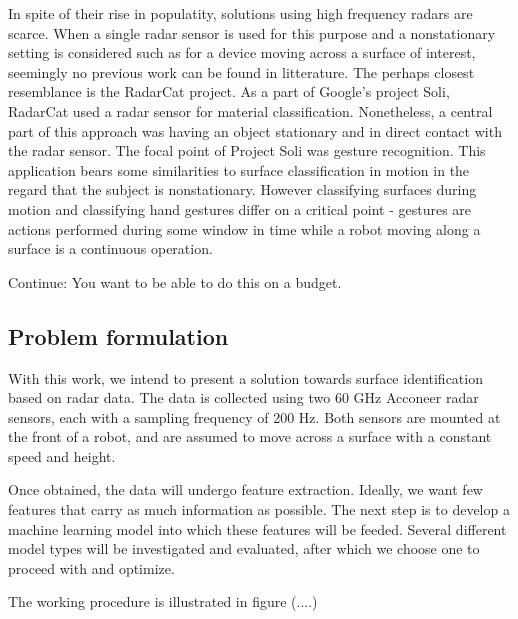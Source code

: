 In spite of their rise in populatity, solutions using high frequency radars are scarce. When a single radar sensor is used for this purpose and a nonstationary setting is considered such as for a device moving across a surface of interest, seemingly no previous work can be found in litterature. The perhaps closest resemblance is the RadarCat project\citep{yeo_2016}. As a part of Google's project Soli, RadarCat used a radar sensor for material classification. Nonetheless, a central part of this approach was having an object stationary and in direct contact with the radar sensor. The focal point of Project Soli was gesture recognition. This application bears some similarities to surface classification in motion in the regard that the subject is nonstationary. However classifying surfaces during motion and classifying hand gestures differ on a critical point - gestures are actions performed during some window in time while a robot moving along a surface is a continuous operation. 



Continue: You want to be able to do this on a budget.

\subsection{Problem formulation}
With this work, we intend to present a solution towards surface identification based on radar data. The data is collected using two 60 GHz Acconeer radar sensors, each with a sampling frequency of 200 Hz. Both sensors are mounted at the front of a robot, and are assumed to move across a surface with a constant speed and height.

Once obtained, the data will undergo feature extraction. Ideally, we want few features that carry as much information as possible. The next step is to develop a machine learning model into which these features will be feeded. Several different model types will be investigated and evaluated, after which we choose one to proceed with and optimize. 

The working procedure is illustrated in figure (....)



